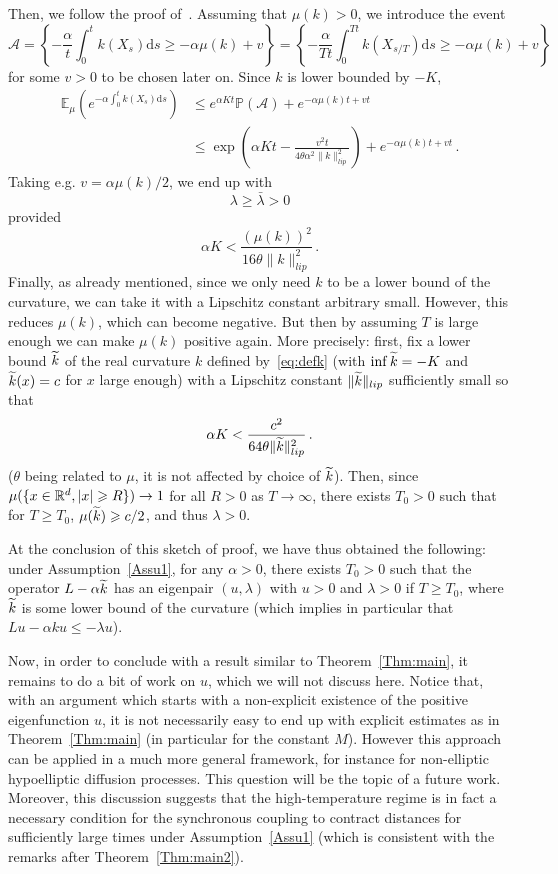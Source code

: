 \documentclass[10pt]{amsart}
\theoremstyle{definition}\newtheorem{defi}[theo]{Definition}\newtheorem{rema}[theo]{Remark}\newtheorem{exam}[theo]{Example}\newtheorem{exem}[theo]{Example}\newtheorem{nota}[theo]{Notation}
\newcommand{\R}{\mathbb R}
\newcommand{\bbP}{\mathbb P}
\newcommand{\bbE}{\mathbb E}
\newcommand{\A}{\mathcal A}
\newcommand{\dd}{\mathrm{d}}
\newcommand{\1}{\mathbbm{1}}
\let\oldtilde\tilde
\renewcommand*{\tilde}[1]{\mathchoice{\widetilde{#1}}{\widetilde{#1}}{\oldtilde{#1}}{\oldtilde{#1}}}
\begin{document}
Then, we follow the proof of~\cite[Corollary~4.4]{CattiauxGuillinFathi}. Assuming that $\mu(k)>0$, we introduce the event
\[
\A = \left\{ - \frac\alpha{t} \int_0^t k(X_{s})\dd s \geqslant - \alpha \mu(k) + v \right\} = \left\{ - \frac\alpha{Tt} \int_0^{Tt} k(X_{s/T})\dd s \geqslant - \alpha \mu(k) + v \right\}
\]
for some $v>0$ to be chosen later on. Since $k$ is lower bounded by $-K$,
\begin{align*}
\bbE_{\mu} \left( e^{- \alpha \int_0^t k(X_{s})\dd s} \right) & \leqslant e^{\alpha Kt} \bbP(\A) + e^{ - \alpha \mu(k) t + v t} \\
& \leqslant \exp\left( \alpha K t - \frac{v^2 t}{4\theta \alpha^2 \|k\|_{lip}^2}\right) + e^{ - \alpha \mu(k) t + v t}\,.
\end{align*}
Taking e.g. $v = \alpha \mu(k)/2$, we end up with
\[
\lambda \geqslant \bar \lambda >0
\]
provided
\[
\alpha K < \frac{ \left( \mu(k)\right)^2 }{16\theta \|k\|_{lip}^2}\,.
\]
Finally, as already mentioned, since we only need $k$ to be a lower bound of the curvature, we can take it with a Lipschitz constant arbitrary small. However, this reduces $\mu(k)$, which can become negative. But then by assuming $T$ is large enough we can make $\mu(k)$ positive again. More precisely: first, fix a lower bound $\tilde k$ of the real curvature $k$ defined by~\eqref{eq:defk} (with $\inf \tilde k = -K$ and $\tilde k(x) = c$ for $x$ large enough) with a Lipschitz constant $\|\tilde k\|_{lip}$ sufficiently small so that
\[
\alpha K < \frac{ c^2 }{64\theta \|\tilde k\|_{lip}^2}\,.
\]
($\theta$ being related to $\mu$, it is not affected by choice of $\tilde k$). Then, since $\mu(\{x\in \R^d, |x|\linebreak \geqslant R\}) \rightarrow 1$ for all $R>0$ as $T\rightarrow \infty$, there exists $T_0>0$ such that for $T\geqslant T_0$, $\mu(\tilde k) \geqslant c/2$, and thus $\lambda>0$.

At the conclusion of this sketch of proof, we have thus obtained the following: under Assumption~\ref{Assu1}, for any $\alpha>0$, there exists $T_0>0$ such that the operator $L - \alpha \tilde k$ has an eigenpair $(u,\lambda)$ with $u>0$ and $\lambda>0$ if $T\geqslant T_0$, where $\tilde k$ is some lower bound of the curvature (which implies in particular that $Lu - \alpha k u \leqslant -\lambda u$).

Now, in order to conclude with a result similar to Theorem~\ref{Thm:main}, it remains to do a bit of work on $u$, which we will not discuss here. Notice that, with an argument which starts with a non-explicit existence of the positive eigenfunction $u$, it is not necessarily easy to end up with explicit estimates as in Theorem~\ref{Thm:main} (in particular for the constant $M$). However this approach can be applied in a much more general framework, for instance for non-elliptic hypoelliptic diffusion processes. This question will be the topic of a future work. Moreover, this discussion suggests that the high-temperature regime is in fact a necessary condition for the synchronous coupling to contract distances for sufficiently large times under Assumption~\ref{Assu1} (which is consistent with the remarks after Theorem~\ref{Thm:main2}). 
\end{document}
